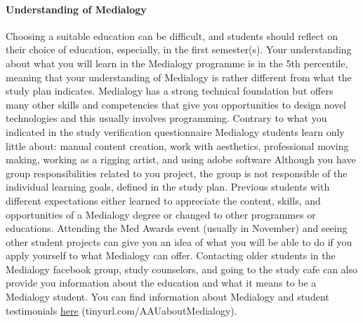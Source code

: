 \documentclass[]{article}
\let\oldparagraph\paragraph
\renewcommand{\paragraph}[1]{\oldparagraph{#1}\mbox{}}
\begin{document}
\paragraph{Understanding of Medialogy}\label{understanding-of-medialogy}

Choosing a suitable education can be difficult, and students should
reflect on their choice of education, especially, in the first
semester(s). Your understanding about what you will learn in the
Medialogy programme is in the 5th percentile, meaning that your
understanding of Medialogy is rather different from what the study plan
indicates. Medialogy has a strong technical foundation but offers many
other skills and competencies that give you opportunities to design
novel technologies and this usually involves programming. Contrary to
what you indicated in the study verification questionnaire Medialogy
students learn only little about: manual content creation, work with
aesthetics, professional moving making, working as a rigging artist, and
using adobe software Although you have group responsibilities related to
you project, the group is not responsible of the individual learning
goals, defined in the study plan. Previous students with different
expectations either learned to appreciate the content, skills, and
opportunities of a Medialogy degree or changed to other programmes or
educations. Attending the Med Awards event (usually in November) and
seeing other student projects can give you an idea of what you will be
able to do if you apply yourself to what Medialogy can offer. Contacting
older students in the Medialogy facebook group, study counselors, and
going to the study cafe can also provide you information about the
education and what it means to be a Medialogy student. You can find
information about Medialogy and student testimonials
\href{tinyurl.com/AAUaboutMedialogy}{here}
(tinyurl.com/AAUaboutMedialogy).
\end{document}
